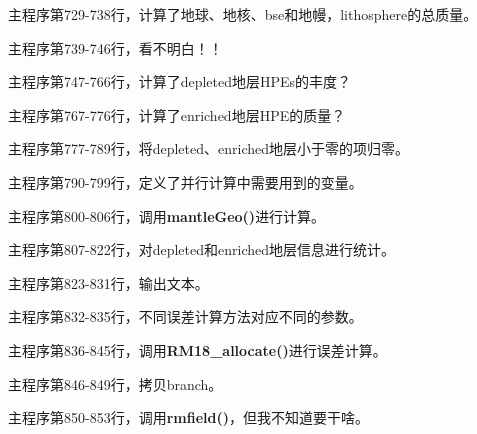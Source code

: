 		\begin{GCBox}[title = Mantle计算]{}
			主程序第729-738行，计算了地球、地核、bse和地幔，lithosphere的总质量。\par
			主程序第739-746行，{\color{red}看不明白！！}\par
			主程序第747-766行，计算了depleted地层HPEs的丰度？\par
			主程序第767-776行，计算了enriched地层HPE的质量？\par
			主程序第777-789行，将depleted、enriched地层小于零的项归零。\par
			主程序第790-799行，定义了并行计算中需要用到的变量。\par
			主程序第800-806行，调用\textbf{mantleGeo()}进行计算。\par
			主程序第807-822行，对depleted和enriched地层信息进行统计。\par
			主程序第823-831行，输出文本。\par
		\end{GCBox}
		\begin{GCBox}[title = 误差计算]{}
			主程序第832-835行，不同误差计算方法对应不同的参数。\par
			主程序第836-845行，调用\textbf{RM18\_allocate()}进行误差计算。\par
			主程序第846-849行，拷贝branch。\par
			主程序第850-853行，调用\textbf{rmfield()}，{\color{red}但我不知道要干啥。}
		\end{GCBox}

